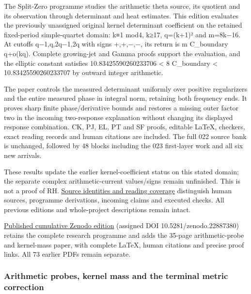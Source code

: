 \documentclass[
]{article}
\begin{document}
The Split-Zero programme studies the arithmetic theta source, its
quotient and its observation through determinant and heat estimates.
This edition evaluates the previously unassigned original kernel
determinant coefficient on the retained fixed-period simple-quartet
domain: k≡1 mod4, k≥17, q=(k+1)² and m=8k−16. At cutoffs q−1,q,2q−1,2q
with signs +,+,−,−, its return is m C\_boundary q+o(kq). Complete
growing-jet and Gamma proofs support the evaluation, and the elliptic
constant satisfies 10.83425590260233706 \textless{} 8 C\_boundary
\textless{} 10.83425590260233707 by outward integer arithmetic.

The paper controls the measured determinant uniformly over positive
regularizers and the entire measured phase in integral norm, retaining
both frequency ends. It proves sharp finite phase/derivative bounds and
restores a missing outer factor two in the incoming two-response
explanation without changing its displayed response combination. CK, PJ,
EL, PT and SF proofs, editable LaTeX, checkers, exact reading records
and human citations are included. The full 022 source bank is unchanged,
followed by 48 blocks including the 023 first-layer work and all six new
arrivals.

These results update the earlier kernel-coefficient status on this
stated domain; the separate complex arithmetic-current values/signs
remain unfinished. This is not a proof of RH.
\href{https://github.com/KokunoYumeto/zeta-function-research-reader/blob/main/workbenches/splitzero-tandem/continuations/20260922-kernel-frequency/SOURCE_READING_USE_LEDGER.json}{Source
identities and reading coverage} distinguish human sources, programme
derivations, incoming claims and executed checks. All previous editions
and whole-project descriptions remain intact.

\href{https://zenodo.org/records/22887380}{Published cumulative Zenodo
edition} (assigned DOI 10.5281/zenodo.22887380) retains the complete
research programme and adds the 35-page arithmetic-probe and kernel-mass
paper, with complete LaTeX, human citations and precise proof links. All
73 earlier PDFs remain separate.

\subsubsection{Arithmetic probes, kernel mass and the terminal metric
correction}\label{arithmetic-probes-kernel-mass-and-the-terminal-metric-correction}
\end{document}
